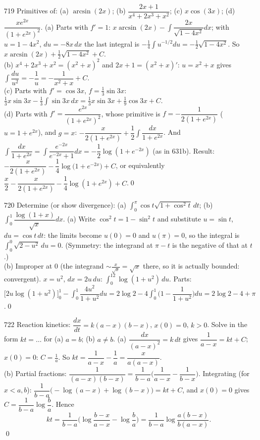 \begin{bookex}{719}
Primitives of: (a) $\arcsin(2x)$; (b) $\dfrac{2x+1}{x^4+2x^3+x^2}$; (c) $x\cos(3x)$; (d) $\dfrac{xe^{2x}}{(1+e^{2x})^2}$.
\solution
(a) Parts with $f'=1$: $x\arcsin(2x)-\int\dfrac{2x}{\sqrt{1-4x^2}}dx$; with $u=1-4x^2$, $du=-8x\,dx$ the last integral is $-\frac14\int u^{-1/2}du=-\frac12\sqrt{1-4x^2}$. So $x\arcsin(2x)+\frac12\sqrt{1-4x^2}+C$.\\
(b) $x^4+2x^3+x^2=(x^2+x)^2$ and $2x+1=(x^2+x)'$: $u=x^2+x$ gives $\int\dfrac{du}{u^2}=-\dfrac1u=-\dfrac1{x^2+x}+C$.\\
(c) Parts with $f'=\cos3x$, $f=\frac13\sin3x$: $\frac13x\sin3x-\frac13\int\sin3x\,dx=\frac13x\sin3x+\frac19\cos3x+C$.\\
(d) Parts with $f'=\dfrac{e^{2x}}{(1+e^{2x})^2}$, whose primitive is $f=-\dfrac1{2(1+e^{2x})}$ ($u=1+e^{2x}$), and $g=x$: $-\dfrac x{2(1+e^{2x})}+\dfrac12\int\dfrac{dx}{1+e^{2x}}$. And $\int\dfrac{dx}{1+e^{2x}}=\int\dfrac{e^{-2x}}{e^{-2x}+1}dx=-\dfrac12\log(1+e^{-2x})$ (as in 631b). Result: $-\dfrac x{2(1+e^{2x})}-\dfrac14\log\big(1+e^{-2x}\big)+C$, or equivalently $\dfrac x2-\dfrac x{2(1+e^{2x})}-\dfrac14\log(1+e^{2x})+C$.\qed
\end{bookex}

\begin{bookex}{720}
Determine (or show divergence): (a) $\int_0^\pi\cos t\sqrt{1+\cos^2t}\,dt$; (b) $\int_0^1\dfrac{\log(1+x)}{\sqrt x}dx$.
\solution
(a) Write $\cos^2t=1-\sin^2t$ and substitute $u=\sin t$, $du=\cos t\,dt$: the limits become $u(0)=0$ and $u(\pi)=0$, so the integral is $\int_0^0\sqrt{2-u^2}\,du=0$. (Symmetry: the integrand at $\pi-t$ is the negative of that at $t$.)\\
(b) Improper at $0$ (the integrand $\sim\frac x{\sqrt x}=\sqrt x$ there, so it is actually bounded: convergent). $x=u^2$, $dx=2u\,du$: $\int_0^12\log(1+u^2)\,du$. Parts: $\big[2u\log(1+u^2)\big]_0^1-\int_0^1\dfrac{4u^2}{1+u^2}du=2\log2-4\int_0^1\Big(1-\dfrac1{1+u^2}\Big)du=2\log2-4+\pi$.\qed
\end{bookex}

\begin{bookex}{722}
Reaction kinetics: $\dfrac{dx}{dt}=k(a-x)(b-x)$, $x(0)=0$, $k>0$. Solve in the form $kt=\dots$ for (a) $a=b$; (b) $a\ne b$.
\solution
(a) $\dfrac{dx}{(a-x)^2}=k\,dt$ gives $\dfrac1{a-x}=kt+C$; $x(0)=0$: $C=\frac1a$. So $kt=\dfrac1{a-x}-\dfrac1a=\dfrac x{a(a-x)}$.\\
(b) Partial fractions: $\dfrac1{(a-x)(b-x)}=\dfrac1{b-a}\Big(\dfrac1{a-x}-\dfrac1{b-x}\Big)$. Integrating (for $x<a,b$): $\dfrac1{b-a}\big(-\log(a-x)+\log(b-x)\big)=kt+C$, and $x(0)=0$ gives $C=\dfrac1{b-a}\log\dfrac ba$. Hence
\[
kt=\frac1{b-a}\Big(\log\frac{b-x}{a-x}-\log\frac ba\Big)=\frac1{b-a}\log\frac{a(b-x)}{b(a-x)} .
\]\qed
\end{bookex}

